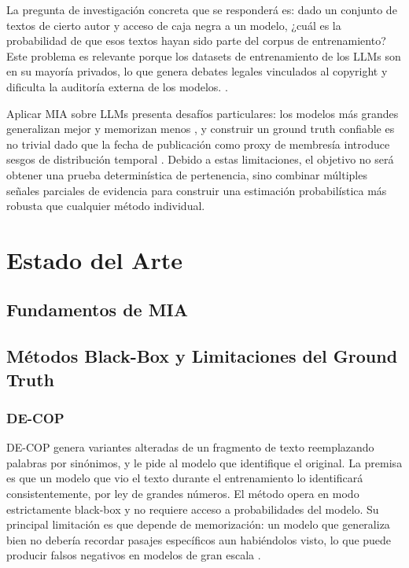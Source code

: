 \documentclass[11pt]{article}
\begin{document}
La pregunta de investigación concreta que se responderá es: dado un conjunto de 
textos de cierto autor y acceso de caja negra a un modelo, ¿cuál es la 
probabilidad de que esos textos hayan sido parte del corpus de entrenamiento? 
Este problema es relevante porque los datasets de entrenamiento de los LLMs son 
en su mayoría privados, lo que genera debates legales vinculados al copyright y 
dificulta la auditoría externa de los modelos.
\citep{duan2024membership}.

Aplicar MIA sobre LLMs presenta desafíos particulares: los modelos más grandes 
generalizan mejor y memorizan menos \citep{duan2024membership}, y construir un 
ground truth confiable es no trivial dado que la fecha de publicación como proxy 
de membresía introduce sesgos de distribución temporal \citep{das2024blind}. 
Debido a estas limitaciones, el objetivo no será obtener una prueba 
determinística de pertenencia, sino combinar múltiples señales parciales de 
evidencia para construir una estimación probabilística más robusta que cualquier 
método individual.


\section{Estado del Arte}

\subsection{Fundamentos de MIA}
\subsection{Métodos Black-Box y Limitaciones del Ground Truth}
\subsubsection{DE-COP}
DE-COP \citep{duarte2024decop} genera variantes alteradas de un fragmento 
de texto reemplazando palabras por sinónimos, y le pide al modelo que identifique 
el original. La premisa es que un modelo que vio el texto durante el entrenamiento 
lo identificará consistentemente, por ley de grandes números. El método opera en 
modo estrictamente black-box y no requiere acceso a probabilidades del modelo. 
Su principal limitación es que depende de memorización: un modelo que generaliza 
bien no debería recordar pasajes específicos aun habiéndolos visto, lo que puede 
producir falsos negativos en modelos de gran escala \citep{duan2024membership}.
\end{document}
